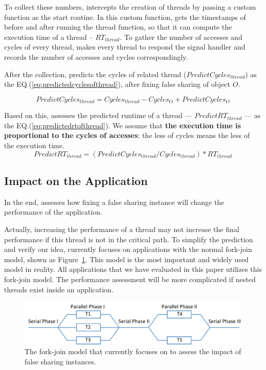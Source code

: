 To collect these numbers, \cheetah{} intercepts the creation of threads by passing a custom function as the start routine. In this custom function, \cheetah{} gets the timestamps of before and after running the thread function, so that it can compute the execution time of a thread -- $RT_{thread}$. To gather the number of accesses and cycles of every thread, \cheetah{} makes every thread to respond the signal handler and records the number of accesses and cycles correspondingly. 

After the collection, \cheetah{} predicts the cycles of related thread ($PredictCycles_{thread}$) as the EQ.(\ref{eq:predictedcyclesofthread}), after fixing false sharing of object $O$. 

\begin{equation}
\label{eq:predictedcyclesofthread}
 PredictCycles_{thread} = Cycles_{thread} - Cycles_{O} + PredictCycles_{O} 
\end{equation} 
 
Based on this, \cheetah{} assesses the predicted runtime of a thread --- $PredictRT_{thread}$ --- as the EQ.(\ref{eq:predictedrtofthread}). We assume that {\bf the execution time is proportional to the cycles of accesses}: the less of cycles means the less of the execution time. 
\begin{equation}
\label{eq:predictedrtofthread}
 PredictRT_{thread} = (PredictCycles_{thread}/Cycles_{thread}) * RT_{thread} 
\end{equation} 

\subsection{Impact on the Application}
\label{sec:impactapp}

In the end, \cheetah{} assesses how fixing a false sharing instance will change the performance of the application. 

Actually, increasing the performance of a thread may not increase the final performance if this  thread is not in the critical path.  
To simplify the prediction and verify our idea, \cheetah{} currently focuses on applications with the normal fork-join model, shown as Figure~\ref{fig:forkjoinmodel}. This model is the most important and widely used model in reality. All applications that we have evaluated in this paper utilizes this fork-join model. The performance assessment will be more complicated if nested threads exist inside an application. 


\begin{figure}[ht!]
\begin{center}
\includegraphics[width=6in]{figure/forkjoin}
\end{center}
\caption{The fork-join model that \Cheetah{} currently focuses on to assess the impact of false sharing instances. }
\label{fig:forkjoinmodel}
\end{figure}

